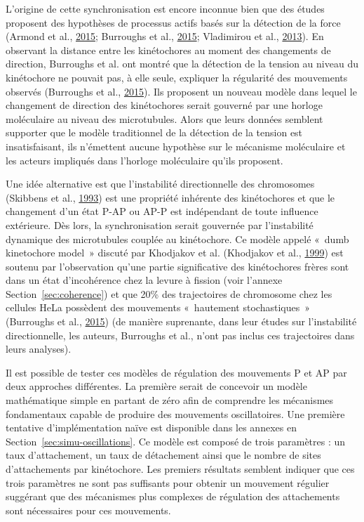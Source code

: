 \documentclass[12pt,a4paper,twoside,openright]{book}
\begin{document}
L'origine de cette synchronisation est encore inconnue bien que des
études proposent des hypothèses de processus actifs basés sur la
détection de la force (Armond et al.,
\protect\hyperlink{ref-Armond2015}{2015}; Burroughs et al.,
\protect\hyperlink{ref-Burroughs2015}{2015}; Vladimirou et al.,
\protect\hyperlink{ref-Vladimirou2013}{2013}). En observant la distance
entre les kinétochores au moment des changements de direction, Burroughs
et al. ont montré que la détection de la tension au niveau du
kinétochore ne pouvait pas, à elle seule, expliquer la régularité des
mouvements observés (Burroughs et al.,
\protect\hyperlink{ref-Burroughs2015}{2015}). Ils proposent un nouveau
modèle dans lequel le changement de direction des kinétochores serait
gouverné par une horloge moléculaire au niveau des microtubules. Alors
que leurs données semblent supporter que le modèle traditionnel de la
détection de la tension est insatisfaisant, ils n'émettent aucune
hypothèse sur le mécanisme moléculaire et les acteurs impliqués dans
l'horloge moléculaire qu'ils proposent.

Une idée alternative est que l'instabilité directionnelle des
chromosomes (Skibbens et al.,
\protect\hyperlink{ref-Skibbens1993}{1993}) est une propriété inhérente
des kinétochores et que le changement d'un état P-AP ou AP-P est
indépendant de toute influence extérieure. Dès lors, la synchronisation
serait gouvernée par l'instabilité dynamique des microtubules couplée au
kinétochore. Ce modèle appelé «~dumb kinetochore model~» discuté par
Khodjakov et al. (Khodjakov et al.,
\protect\hyperlink{ref-Khodjakov1999}{1999}) est soutenu par
l'observation qu'une partie significative des kinétochores frères sont
dans un état d'incohérence chez la levure à fission (voir l'annexe
Section~\ref{sec:coherence}) et que 20\% des trajectoires de chromosome
chez les cellules HeLa possèdent des mouvements «~hautement
stochastiques~» (Burroughs et al.,
\protect\hyperlink{ref-Burroughs2015}{2015}) (de manière suprenante,
dans leur études sur l'instabilité directionnelle, les auteurs,
Burroughs et al., n'ont pas inclus ces trajectoires dans leurs
analyses).

Il est possible de tester ces modèles de régulation des mouvements P et
AP par deux approches différentes. La première serait de concevoir un
modèle mathématique simple en partant de zéro afin de comprendre les
mécanismes fondamentaux capable de produire des mouvements
oscillatoires. Une première tentative d'implémentation naïve est
disponible dans les annexes en Section~\ref{sec:simu-oscillations}. Ce
modèle est composé de trois paramètres : un taux d'attachement, un taux
de détachement ainsi que le nombre de sites d'attachements par
kinétochore. Les premiers résultats semblent indiquer que ces trois
paramètres ne sont pas suffisants pour obtenir un mouvement régulier
suggérant que des mécanismes plus complexes de régulation des
attachements sont nécessaires pour ces mouvements.
\end{document}
